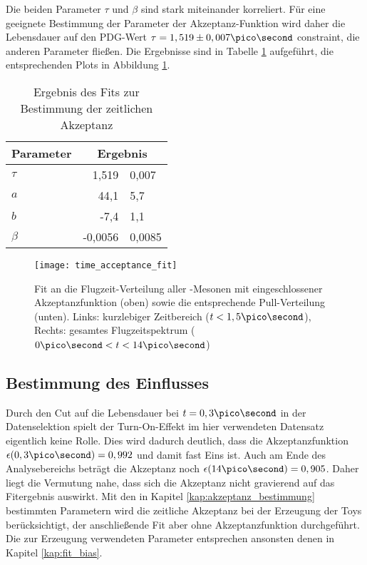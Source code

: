 Die beiden Parameter $\tau$ und $\beta$ sind stark miteinander korreliert. Für eine geeignete Bestimmung der Parameter der Akzeptanz-Funktion wird daher die Lebensdauer auf den PDG-Wert $\tau = 1,519 \pm 0,007 \pico\second$ \cite{pdg-tau} constraint, die anderen Parameter fließen. Die Ergebnisse sind in Tabelle \ref{tab:fit_akzeptanz} aufgeführt, die entsprechenden Plots in Abbildung \ref{fig:fit_akzeptanz}. 

\begin{table}[hptb]
\centering
\caption{Ergebnis des Fits zur Bestimmung der zeitlichen Akzeptanz}
\label{tab:fit_akzeptanz}
\begin{tabular}{lr@{$\pm$}l}
\hline \hline 
Parameter & \multicolumn{2}{c}{Ergebnis}  \\ \hline
$\tau$    &  1,519   & 0,007 \\
$a$       &  44,1    & 5,7 \\
$b$       &  -7,4    & 1,1 \\
$\beta$   &  -0,0056 & 0,0085 \\ 
\hline \hline
\end{tabular}
\end{table}

\begin{figure}[hptb]
\centering
\texttt{[image: time\_acceptance\_fit]}
\caption{Fit an die Flugzeit-Verteilung aller \Bd-Mesonen mit eingeschlossener Akzeptanzfunktion (oben) sowie die entsprechende Pull-Verteilung (unten). Links: kurzlebiger Zeitbereich ($t<1,5\pico\second$), Rechts: gesamtes Flugzeitspektrum ($0\ps < t < 14\ps$)}
\label{fig:fit_akzeptanz}
\end{figure}

\subsection{Bestimmung des Einflusses}
Durch den Cut auf die Lebensdauer bei $t = 0,3\ps$ in der Datenselektion spielt der Turn-On-Effekt im hier verwendeten Datensatz eigentlich keine Rolle. Dies wird dadurch deutlich, dass die Akzeptanzfunktion $\epsilon(0,3\ps) = 0,992$ und damit fast Eins ist. Auch am Ende des Analysebereichs beträgt die Akzeptanz noch $\epsilon(14\ps) = 0,905$. Daher liegt die Vermutung nahe, dass sich die Akzeptanz nicht gravierend auf das Fitergebnis auswirkt. Mit den in Kapitel \ref{kap:akzeptanz_bestimmung} bestimmten Parametern wird die zeitliche Akzeptanz bei der Erzeugung der Toys berücksichtigt, der anschließende Fit aber ohne Akzeptanzfunktion durchgeführt. Die zur Erzeugung verwendeten Parameter entsprechen ansonsten denen in Kapitel \ref{kap:fit_bias}.

